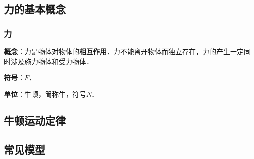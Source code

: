
\begin{issues}
\issueDraft
\issueTODO
\end{issues}

\subsection{力的基本概念}
\subsubsection{力}
\textbf{概念}：力是物体对物体的\textbf{相互作用}．力不能离开物体而独立存在，力的产生一定同时涉及施力物体和受力物体．

\textbf{符号}：$F$．

\textbf{单位}：牛顿，简称牛，符号$N$．

\subsection{牛顿运动定律}

\subsection{常见模型}
